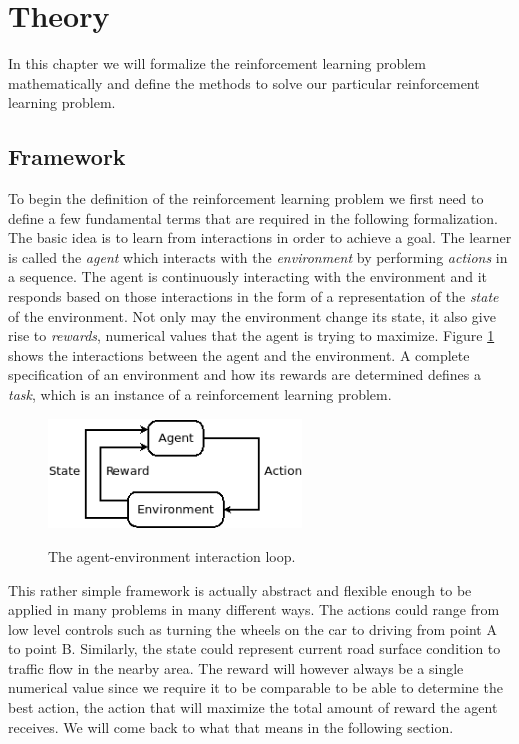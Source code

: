 \documentclass[result.tex]{subfiles}
\begin{document}
    \section*{\centering Theory}

    In this chapter we will formalize the reinforcement learning problem mathematically and define the methods to solve our particular reinforcement learning problem.

    \subsection*{Framework}

    To begin the definition of the reinforcement learning problem we first need to define a few fundamental terms that are required in the following formalization. The basic idea is to learn from interactions in order to achieve a goal. The learner is called the \textit{agent} which interacts with the \textit{environment} by performing \textit{actions} in a sequence. The agent is continuously interacting with the environment and it responds based on those interactions in the form of a representation of the \textit{state} of the environment. Not only may the environment change its state, it also give rise to \textit{rewards}, numerical values that the agent is trying to maximize. Figure \ref{fig:agent_env} shows the interactions between the agent and the environment. A complete specification of an environment and how its rewards are determined defines a \textit{task}, which is an instance of a reinforcement learning problem.

    \begin{figure}[H]
        \centering
        \includegraphics[width=0.6\textwidth]{./images/agent_env}
        \label{fig:agent_env}
        \caption{The agent-environment interaction loop.}
    \end{figure}

    This rather simple framework is actually abstract and flexible enough to be applied in many problems in many different ways. The actions could range from low level controls such as turning the wheels on the car to driving from point A to point B. Similarly, the state could represent current road surface condition to traffic flow in the nearby area. The reward will however always be a single numerical value since we require it to be comparable to be able to determine the best action, the action that will maximize the total amount of reward the agent receives. We will come back to what that means in the following section.
\end{document}
